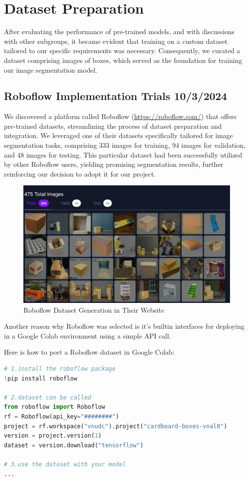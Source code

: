 \chapter{Dataset Preparation }
After evaluating the performance of pre-trained models, and with discussions with other subgroups, it became evident that training on a custom dataset tailored to our specific requirements was necessary. Consequently, we curated a dataset comprising images of boxes, which served as the foundation for training our image segmentation model.

\section{Roboflow Implementation Trials 10/3/2024}
We discovered a platform called Roboflow (\url{https://roboflow.com/}) that offers pre-trained datasets, streamlining the process of dataset preparation and integration. We leveraged one of their datasets specifically tailored for image segmentation tasks, comprising 333 images for training, 94 images for validation, and 48 images for testing. This particular dataset had been successfully utilized by other Roboflow users, yielding promising segmentation results, further reinforcing our decision to adopt it for our project.

\begin{figure}[H]
    \centering
    \includegraphics[width=450pt]{assets/roboflow}
    \caption{Roboflow Dataset Generation in Their Website}
    \label{fig:using:roboflowgen}
\end{figure}

Another reason why Roboflow was selected is it’s builtin interfaces for deploying in a Google Colab environment using a simple API call.

Here is how to port a Roboflow dataset in Google Colab:
\begin{lstlisting}[language=Python]
# 1.install the roboflow package
!pip install roboflow

# 2.dataset can be called
from roboflow import Roboflow
rf = Roboflow(api_key="########")
project = rf.workspace("vnudc").project("cardboard-boxes-vnal0")
version = project.version(1)
dataset = version.download("tensorflow")

# 3.use the dataset with your model
...
\end{lstlisting}

